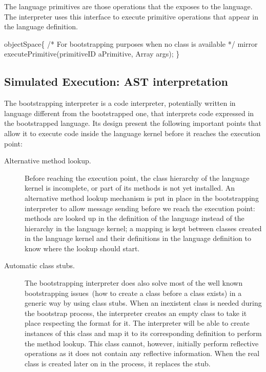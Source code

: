 The language primitives are those operations that the \VM exposes to the language. The interpreter uses this interface to execute primitive operations that appear in the language definition.

\begin{code}
objectSpace\{
    /* For bootstrapping purposes when no class is available */
    mirror executePrimitive(primitiveID aPrimitive, Array args); 
\}
\end{code}



\subsection{Simulated Execution: AST interpretation}

The bootstrapping interpreter is a code interpreter, potentially written in language different from the bootstrapped one, that interprets code expressed in the bootstrapped language. Its design present the following important points that allow it to execute code inside the language kernel before it reaches the execution point:

\begin{description}
\item[Alternative method lookup.] Before reaching the execution point, the class hierarchy of the language kernel is incomplete, or part of its methods is not yet installed. An alternative method lookup mechanism is put in place in the bootstrapping interpreter to allow message sending before we reach the execution point: methods are looked up in the definition of the language instead of the hierarchy in the language kernel; a mapping is kept between classes created in the language kernel and their definitions in the language definition to know where the lookup should start.

\item[Automatic class stubs.] The bootstrapping interpreter does also solve most of the well known bootstrapping issues~(\eg how to create a class before a class exists) in a generic way by using class stubs. When an inexistent class is needed during the bootstrap process, the interpreter creates an empty class to take it place respecting the \VM format for it. The interpreter will be able to create instances of this class and map it to its corresponding definition to perform the method lookup. This class cannot, however, initially perform reflective operations as it does not contain any reflective information. When the real class is created later on in the process, it replaces the stub.
\end{description}

